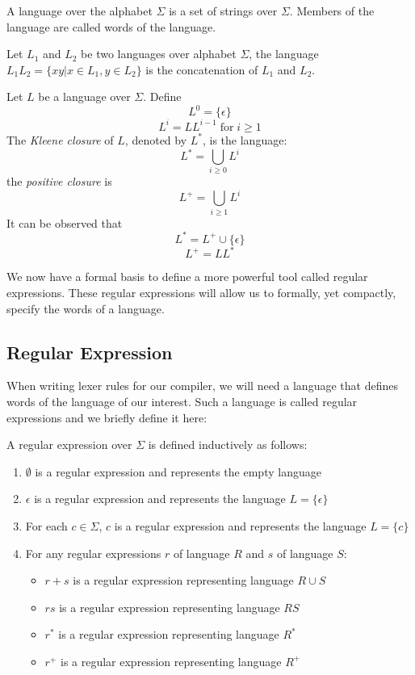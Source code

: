 \begin{defn}[Language]
  A language over the alphabet $\Sigma$ is a set of strings over
  $\Sigma$. Members of the language are called words of the language.
\end{defn}

\begin{defn}[Concatenation]
  Let $L_1$ and $L_2$ be two languages over alphabet $\Sigma$, the
  language $L_1 L_2 = \{x y | x \in L_1, y \in L_2 \}$ is the
  concatenation of $L_1$ and $L_2$.
\end{defn}

\begin{defn}
  Let $L$ be a language over $\Sigma$. Define 
  $$L^0 = \{ \epsilon \}$$
  $$L^i = L L^{i-1} \; \textrm{for} \; i \ge 1$$
  The \emph{Kleene closure} of $L$, denoted by $L^*$, is the language:
  $$ L^* = \bigcup_{i \ge 0} L^i $$
  the \emph{positive closure} is
  $$ L^+ = \bigcup_{i \ge 1} L^i $$
  It can be observed that
  $$ L^* = L^+ \cup \{ \epsilon \} $$
  $$ L^+ = L L^* $$
\end{defn}

We now have a formal basis to define a more powerful tool called
regular expressions. These regular expressions will allow us to
formally, yet compactly, specify the words of a language.

\subsection{Regular Expression}

When writing lexer rules for our compiler, we will need a language
that defines words of the language of our interest. Such a language is
called regular expressions and we briefly define it here:

\begin{defn}
  A regular expression over $\Sigma$ is defined inductively as follows:
  \begin{enumerate}
  \item $\emptyset$ is a regular expression and represents the empty language
  \item $\epsilon$ is a regular expression and represents the language
    $L = \{ \epsilon \}$
  \item For each $c \in \Sigma$, $c$ is a regular expression and
    represents the language $L = \{ c \}$
  \item For any regular expressions $r$ of language $R$ and $s$ of language $S$:
    \begin{itemize}
    \item $r+s$ is a regular expression representing language $R \cup S$
    \item $r s$ is a regular expression representing language $R S$
    \item $r^*$ is a regular expression representing language $R^*$
    \item $r^+$ is a regular expression representing language $R^+$
    \end{itemize}
  \end{enumerate}
\end{defn}

